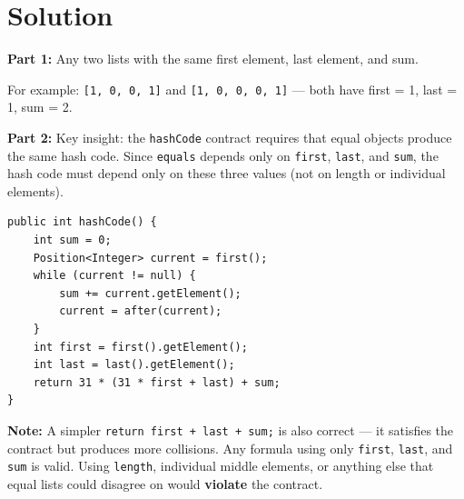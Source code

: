 \documentclass[11pt]{article}
\begin{document}
\vfill

\newpage

{\color{blue}
\section*{Solution}

\textbf{Part 1:} Any two lists with the same first element, last element, and sum.

For example: \texttt{[1, 0, 0, 1]} and \texttt{[1, 0, 0, 0, 1]} --- both have first = 1, last = 1, sum = 2.

\medskip

\textbf{Part 2:} Key insight: the \texttt{hashCode} contract requires that
equal objects produce the same hash code. Since \texttt{equals} depends only
on \texttt{first}, \texttt{last}, and \texttt{sum}, the hash code must depend
only on these three values (not on length or individual elements).

\begin{lstlisting}[basicstyle=\ttfamily\small\color{blue},
  keywordstyle=\bfseries\color{blue!70!black},
  commentstyle=\color{blue!50}]
public int hashCode() {
    int sum = 0;
    Position<Integer> current = first();
    while (current != null) {
        sum += current.getElement();
        current = after(current);
    }
    int first = first().getElement();
    int last = last().getElement();
    return 31 * (31 * first + last) + sum;
}
\end{lstlisting}

\textbf{Note:} A simpler \texttt{return first + last + sum;} is also correct ---
it satisfies the contract but produces more collisions.
Any formula using only \texttt{first}, \texttt{last}, and \texttt{sum} is valid.
Using \texttt{length}, individual middle elements, or anything else that
equal lists could disagree on would \textbf{violate} the contract.
}
\end{document}
